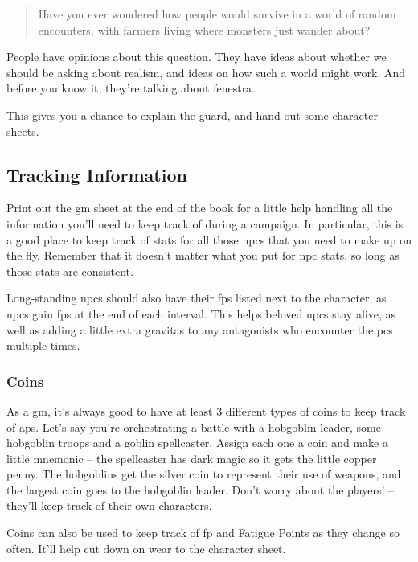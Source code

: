 \begin{multicols}{2}
\begin{quotation}
  Have you ever wondered how people would survive in a world of random encounters, with farmers living where monsters just wander about?
\end{quotation}

People have opinions about this question.
They have ideas about whether we should be asking about realism, and ideas on how such a world might work.
And before you know it, they're talking about \gls{fenestra}.

This gives you a chance to explain the \gls{guard}, and hand out some character sheets.

\subsection{Tracking Information}

Print out the \gls{gm} sheet at the end of the book for a little help handling all the information you'll need to keep track of during a campaign.
In particular, this is a good place to keep track of stats for all those \glspl{npc} that you need to make up on the fly.
Remember that it doesn't matter what you put for \gls{npc} stats, so long as those stats are consistent.

Long-standing \glspl{npc} should also have their \glspl{fp} listed next to the character, as \glspl{npc} gain \glspl{fp} at the end of each \gls{interval}.
This helps beloved \glspl{npc} stay alive, as well as adding a little extra gravitas to any antagonists who encounter the \glspl{pc} multiple times.

\subsubsection{Coins}

As a \gls{gm}, it's always good to have at least 3 different types of coins to keep track of \glspl{ap}.
Let's say you're orchestrating a battle with a hobgoblin leader, some hobgoblin troops and a goblin spellcaster.
Assign each one a coin and make a little mnemonic -- the spellcaster has dark magic so it gets the little copper penny.
The hobgoblins get the silver coin to represent their use of weapons, and the largest coin goes to the hobgoblin leader.
Don't worry about the players'  -- they'll keep track of their own characters.

Coins can also be used to keep track of \gls{fp} and Fatigue Points as they change so often.
It'll help cut down on wear to the character sheet.


\end{multicols}
